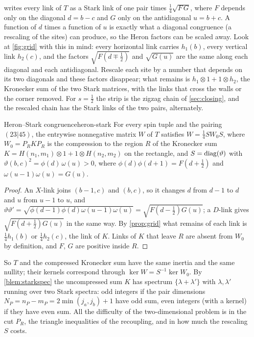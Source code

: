  writes every link of $T$ as a Stark link of one pair times
$\frac14\sqrt{F\,G}$, where $F$ depends only on the diagonal $d=b-c$ and $G$ only on
the antidiagonal $u=b+c$. A function of $d$ times a function of $u$ is exactly what a
diagonal congruence (a rescaling of the sites) can produce, so the Heron factors can be
scaled away. Look at
\cref{fig:grid} with this in mind: every horizontal link carries $h_1(b)$, every
vertical link $h_2(c)$, and the factors $\sqrt{F(d\mp\frac12)}$ and $\sqrt{G(u)}$ are
the same along each diagonal and each antidiagonal. Rescale each site by a number that
depends on its two diagonals and these factors disappear; what remains is
$h_1\otimes1+1\otimes h_2$, the Kronecker sum of the two Stark matrices, with the
links that cross the walls or the corner removed. For $s=\frac12$ the strip is the
zigzag chain of \cref{sec:closing}, and the rescaled chain has the Stark links of the
two pairs, alternately.

\begin{theorem}{Heron--Stark congruence}{heron-stark}
For every spin tuple and the pairing $(23|45)$, the entrywise nonnegative matrix $W$ of $T$
satisfies $W=\frac14SW_0S$, where $W_0=P_RKP_R$ is the compression to the region $R$
of the Kronecker sum $K=H(n_1,m_1)\otimes1+1\otimes H(n_2,m_2)$ on the rectangle, and
$S=\operatorname{diag}(\vartheta)$ with $\vartheta(b,c)^2=\phi(d)\,\omega(u)>0$, where
$\phi(d)\phi(d+1)=F(d+\frac12)$ and $\omega(u-1)\omega(u)=G(u)$.
\end{theorem}

\begin{proof}
An $X$-link joins $(b-1,c)$ and $(b,c)$, so it changes $d$ from $d-1$ to $d$ and $u$
from $u-1$ to $u$, and $\vartheta\vartheta'=\sqrt{\phi(d-1)\phi(d)\omega(u-1)\omega(u)}=
\sqrt{F(d-\frac12)G(u)}$; a $D$-link gives $\sqrt{F(d+\frac12)G(u)}$ in the same way.
By \cref{prop:grid} what remains of each link is $\frac14h_1(b)$ or $\frac14h_2(c)$,
the link of $K$. Links of $K$ that leave $R$ are absent from $W_0$ by definition, and
$F$, $G$ are positive inside $R$.
\end{proof}

So $T$ and the compressed Kronecker sum have the same inertia and the same nullity; their
kernels correspond through $\ker W=S^{-1}\ker W_0$. By \cref{blem:starkspec} the uncompressed sum $K$ has spectrum
$\{\lambda+\lambda'\}$ with $\lambda,\lambda'$ running over two Stark spectra: odd
integers if the pair dimensions $N_P=n_P-m_P=2\min(j_a,j_b)+1$ have odd sum, even
integers (with a kernel) if they have even sum. All the difficulty of the
two-dimensional problem is in the cut $P_R$, the triangle inequalities of the
recoupling, and in how much the rescaling $S$ costs.

